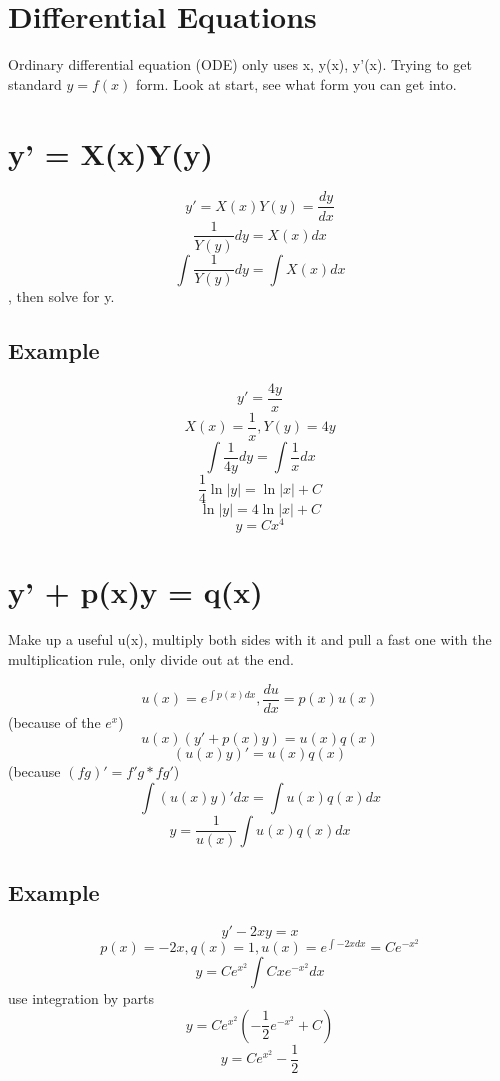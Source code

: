\section{Differential Equations}

Ordinary differential equation (ODE) only uses x, y(x), y'(x). Trying
to get standard $y = f(x)$ form. Look at start, see what form you can
get into.

\begin{multicols}{2}

\section{y' = X(x)Y(y)}

$$ y' = X(x)Y(y) = \frac{dy}{dx} $$
$$ \frac{1}{Y(y)}dy = X(x)dx $$
$$ \int\frac{1}{Y(y)}dy = \int X(x)dx $$, then solve for y.

\subsection{Example}

$$ y' = \frac{4y}{x} $$
$$ X(x) = \frac{1}{x}, Y(y) = 4y $$
$$ \int\frac{1}{4y}dy = \int\frac{1}{x}dx  $$
$$ \frac{1}{4}\ln|y| = \ln|x| + C $$
$$ \ln|y| = 4\ln|x| + C $$
$$ y = Cx^4 $$
\columnbreak

\section{y' + p(x)y = q(x)}

Make up a useful u(x), multiply both sides with it and pull a fast one
with the multiplication rule, only divide out at the end.

$$ u(x) = e^{\int p(x)dx}, \frac{du}{dx} = p(x)u(x) $$ (because of the
$e^x$)
$$ u(x)(y' + p(x)y) = u(x)q(x) $$
$$ (u(x)y)' = u(x)q(x) $$ (because $(fg)' = f'g * fg'$)
$$ \int (u(x)y)' dx = \int u(x)q(x)dx $$
$$ y = \frac{1}{u(x)}\int u(x)q(x)dx $$

\subsection{Example}

$$ y' - 2xy = x $$
$$ p(x) = -2x, q(x) = 1, u(x) = e^{\int -2xdx} = Ce^{-x^2} $$
$$ y = Ce^{x^2}\int Cxe^{-x^2}dx $$
use integration by parts
$$ y = Ce^{x^2}(-\frac{1}{2}e^{-x^2} + C)$$
$$ y = Ce^{x^2} - \frac{1}{2} $$
\end{multicols}


